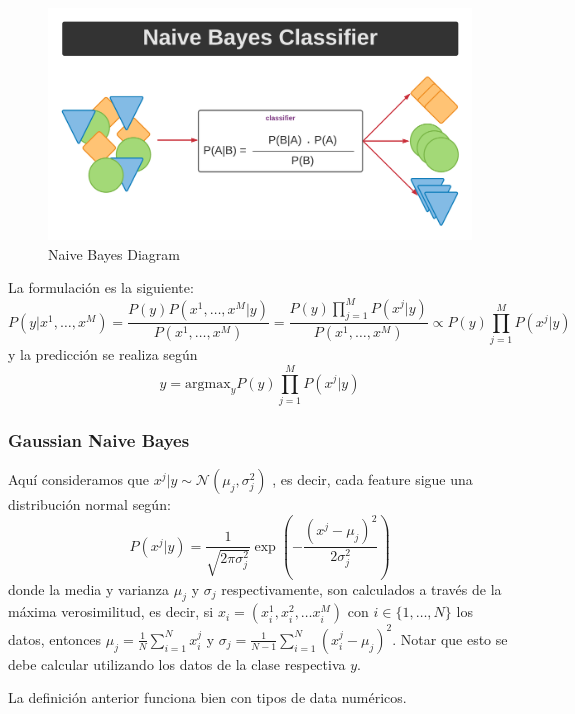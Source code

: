 \begin{figure}[H]
    \center
    \includegraphics[scale=0.4]{notebooks/ML/img/naive_bayes_diagram.png}
    \caption{Naive Bayes Diagram}
\end{figure}

La formulación es la siguiente: 
$$
P(y | x^1 , \dots , x^M) = \frac{P(y)P(x^1 , \dots , x^M| y)}{P(x^1 , \dots , x^M)} = \frac{P(y)\prod_{j=1}^M P(x^j | y)}{P(x^1 , \dots , x^M)} \propto P(y)\prod_{j=1}^M  P(x^j | y)
$$
y la predicción se realiza según 
$$
\hat{y} = \text{argmax}_{y} P(y)\prod_{j=1}^M  P(x^j | y)
$$

\subsubsection{Gaussian Naive Bayes}

Aquí consideramos que $x^{j} | y \sim \mathcal{N}(\mu_j , \sigma_j^2)$ , es decir, cada feature sigue una distribución normal según:
$$
P(x^j | y) = \frac{1}{\sqrt{2\pi\sigma_j^2}}\exp \left(- \frac{(x^j - \mu_j)^2}{2\sigma_j^2} \right )
$$
donde la media y varianza $\mu_j$ y $\sigma_j$ respectivamente, son calculados a través de la máxima verosimilitud, es decir, si $x_{i} = (x^{1}_i, x^{2}_i, \dots x^{M}_i)$ con $i \in \{1, \dots, N\}$ los datos, entonces
$ \mu_{j} = \frac{1}{N}\sum_{i=1}^{N}x_{i}^{j}$ y $ \sigma_{j} = \frac{1}{N-1}\sum_{i=1}^{N}(x_{i}^{j}-\mu_{j})^2$. Notar que esto se debe calcular utilizando los datos de la clase respectiva $y$. 

La definición anterior funciona bien con tipos de data numéricos. 


